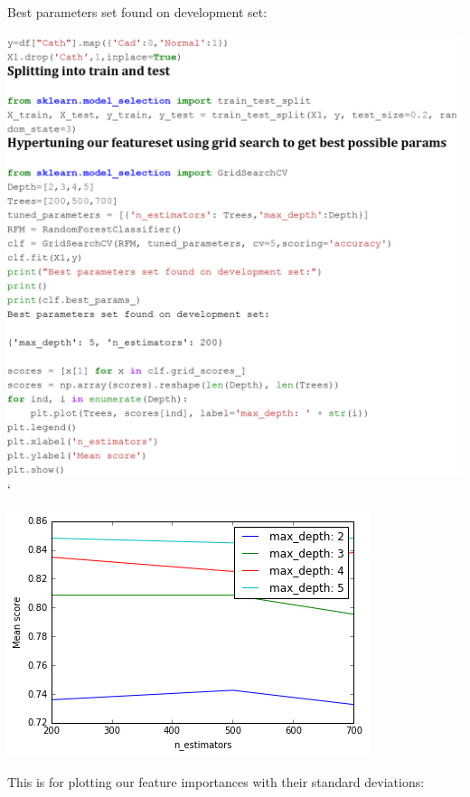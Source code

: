 \documentclass[sigconf]{acmart}
\begin{document}
Best parameters set found on development set:

\includegraphics[width=0.95\columnwidth]{project/images/Untitled5.png}
`

\includegraphics[width=0.95\columnwidth]{images/output_15_1.png}

This is for plotting our feature importances with their standard deviations:
\end{document}
